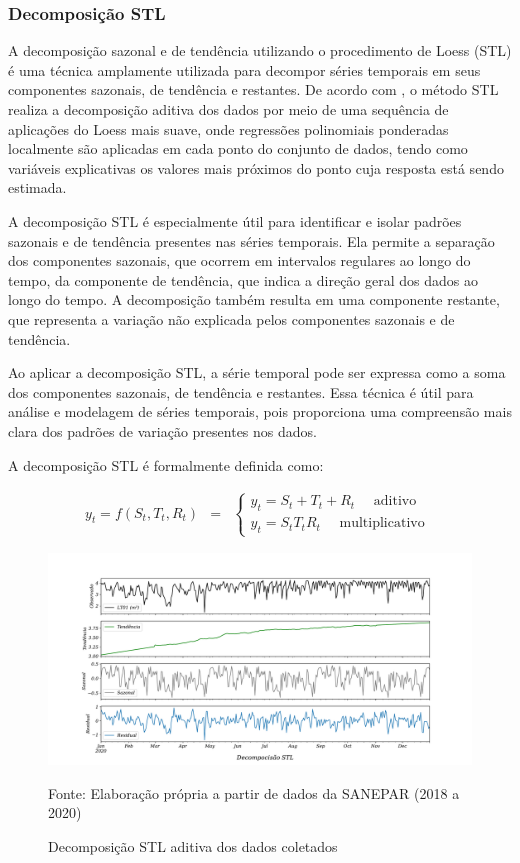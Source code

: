 \subsubsection{Decomposi\c c\~ao STL}\label{subsubsec:stl}

A decomposição sazonal e de tendência utilizando o procedimento de Loess (STL) é uma técnica amplamente utilizada para decompor séries temporais em seus componentes sazonais, de tendência e restantes. De acordo com , o método STL realiza a decomposição aditiva dos dados por meio de uma sequência de aplicações do Loess mais suave, onde regressões polinomiais ponderadas localmente são aplicadas em cada ponto do conjunto de dados, tendo como variáveis explicativas os valores mais próximos do ponto cuja resposta está sendo estimada.

A decomposição STL é especialmente útil para identificar e isolar padrões sazonais e de tendência presentes nas séries temporais. Ela permite a separação dos componentes sazonais, que ocorrem em intervalos regulares ao longo do tempo, da componente de tendência, que indica a direção geral dos dados ao longo do tempo. A decomposição também resulta em uma componente restante, que representa a variação não explicada pelos componentes sazonais e de tendência.

Ao aplicar a decomposição STL, a série temporal pode ser expressa como a soma dos componentes sazonais, de tendência e restantes. Essa técnica é útil para análise e modelagem de séries temporais, pois proporciona uma compreensão mais clara dos padrões de variação presentes nos dados.

A decomposição STL é formalmente definida como:

\begin{eqnarray}
	y_t=f\left(S_t, T_t, R_t\right)&=&\left\{\begin{array}{l}
		y_t=S_t+T_t+R_t \quad \text { aditivo } \\
		y_t=S_t T_t R_t \quad \text { multiplicativo }
	\end{array}\right. \label{eq:stl}
\end{eqnarray}

\begin{figure}[H]
	\centering
	\caption{Decomposição STL aditiva dos dados coletados}
	\label{fig:stl-aditiva}
	\includegraphics[width=0.9\linewidth]{"Resultados/Figuras/STL aditiva"}
	
	Fonte: Elaboração própria a partir de dados da SANEPAR (2018 a 2020)
\end{figure}


